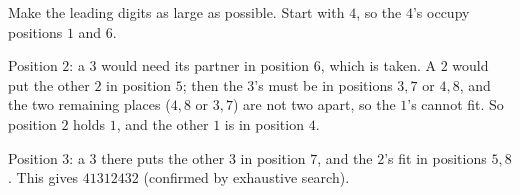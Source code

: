 Make the leading digits as large as possible. Start with $4$, so the $4$'s occupy positions $1$ and $6$.

Position $2$: a $3$ would need its partner in position $6$, which is taken. A $2$ would put the other $2$ in position $5$; then the $3$'s must be in positions $3,7$ or $4,8$, and the two remaining places ($4,8$ or $3,7$) are not two apart, so the $1$'s cannot fit. So position $2$ holds $1$, and the other $1$ is in position $4$.

Position $3$: a $3$ there puts the other $3$ in position $7$, and the $2$'s fit in positions $5,8$. This gives $\boxed{41312432}$ (confirmed by exhaustive search).
